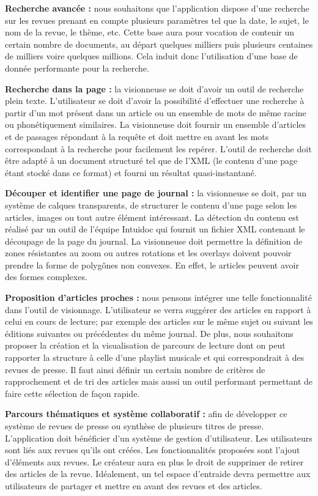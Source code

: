     \textbf{Recherche avancée :} nous souhaitons que l’application dispose d’une recherche sur les revues prenant en compte plusieurs paramètres
    tel que la date, le sujet, le nom de la revue, le thème, etc. Cette base aura pour vocation de contenir un certain nombre de documents, au
    départ quelques milliers puis plusieurs centaines de milliers voire quelques millions. Cela induit donc l’utilisation d’une base de donnée
    performante pour la recherche.

    \textbf{Recherche dans la page :} la visionneuse se doit d’avoir un outil de recherche plein texte. L’utilisateur se doit d’avoir la possibilité
    d’effectuer une recherche à partir d’un mot présent dans un article ou un ensemble de mots de même racine ou phonétiquement similaires.
    La visionneuse doit fournir un ensemble d’articles et de passages répondant à la requête et doit mettre en avant les mots correspondant à la recherche pour facilement les repérer.
    L’outil de recherche doit être adapté à un document structuré tel que de l’XML (le contenu d’une page étant stocké dans ce format) et fourni
    un résultat quasi-instantané.


    \textbf{Découper et identifier une page de journal :} la visionneuse se doit, par un système de calques transparents, de structurer le contenu d’une page selon
    les articles, images ou tout autre élément intéressant. La détection du contenu est réalisé par un outil de l’équipe Intuidoc qui fournit un
    fichier XML contenant le découpage de la page du journal. La visionneuse doit permettre la définition de zones résistantes au zoom ou autres
    rotations et les overlays doivent pouvoir prendre la forme de polygônes non convexes. En effet, le articles peuvent avoir des formes complexes.


    \textbf{Proposition d’articles proches :} nous pensons intégrer une telle fonctionnalité dans l’outil de visionnage. L'utilisateur se verra
    suggérer des articles en rapport à celui en cours de lecture; par exemple des articles sur le même sujet ou suivant les éditions suivantes ou précédentes
    du même journal. De plus, nous souhaitons proposer la création et la visualisation de parcours de lecture dont on peut rapporter la structure
    à celle d’une playlist musicale et qui correspondrait à des revues de presse. Il faut ainsi définir un certain nombre de critères de rapprochement
    et de tri des articles mais aussi un outil performant permettant de faire cette sélection de façon rapide.


    \textbf{Parcours thématiques et système collaboratif :} afin de développer ce système de revues de presse ou synthèse de plusieurs titres de presse. L’application doit bénéficier d’un
    système de gestion d’utilisateur. Les utilisateurs sont liés aux revues qu’ils ont créées. Les fonctionnalités proposées sont l’ajout d'éléments
    aux revues. Le créateur aura en plus le droit de supprimer de retirer des articles de la revue. Idéalement, un tel espace d’entraide devra permettre
    aux utilisateurs de partager et mettre en avant des revues et des articles.

